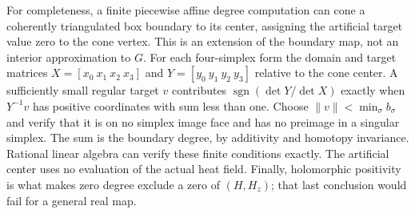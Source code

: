 For completeness, a finite piecewise affine degree computation can
cone a coherently triangulated box boundary to its center, assigning
the artificial target value zero to the cone vertex. This is an
extension of the boundary map, not an interior approximation to $G$.
For each four-simplex form the domain and target matrices
$X=[x_0\ x_1\ x_2\ x_3]$ and
$Y=[y_0\ y_1\ y_2\ y_3]$ relative to the cone center. A sufficiently
small regular target $v$ contributes $\operatorname{sgn}(\det Y/\det X)$
exactly when $Y^{-1}v$ has positive coordinates with sum less than one.
Choose $\|v\|<\min_\sigma b_\sigma$ and verify that it is on no
simplex image face and has no preimage in a singular simplex. The sum
is the boundary degree, by additivity and homotopy invariance. Rational
linear algebra can verify these finite conditions exactly. The
artificial center uses no evaluation of the actual heat field. Finally,
holomorphic positivity is what makes zero degree exclude a zero of
$(H,H_z)$; that last conclusion would fail for a general real map.
